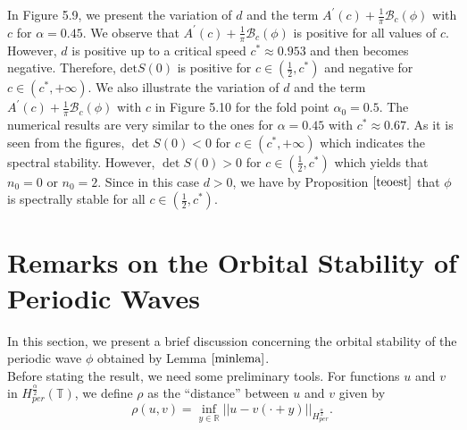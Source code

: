 \documentclass[12pt,reqno]{amsart}
\newcommand{\2}{L^2_{per}(0, T)}
\newcommand{\Hn}{{H_{per}^{\frac{\alpha}{2}}}}
\numberwithin{equation}{section}
\numberwithin{figure}{section}
\begin{document}
In Figure 5.9, we present the variation of $d$ and the term  $A^{\prime}(c)+\displaystyle\frac{1}{\pi} {\mathcal B}_c(\phi)$ with $c$ for $\alpha=0.45$.  We observe that
$A^{\prime}(c)+\displaystyle\frac{1}{\pi} {\mathcal B}_c(\phi)$ is  positive for all values of $c$. However, $d$ is positive up to a critical speed $c^* \approx 0.953$ and then becomes negative. Therefore, $\mbox{det} S(0)$ is positive for $c\in (\frac{1}{2}, c^*)$ and negative for $c\in (c^*, +\infty)$.   We  also illustrate  the variation of $d$ and the term  $A^{\prime}(c)+\displaystyle\frac{1}{\pi} {\mathcal B}_c(\phi)$ with $c$ in Figure 5.10 for the fold point $\alpha_0=0.5$. The numerical results are very similar to the ones for $\alpha=0.45$ with $c^* \approx 0.67$.  As it is seen from the figures,  $\det S(0)<0$  for $c\in (c^*, +\infty)$ which indicates the spectral stability.  However, $\det S(0)>0$  for $c\in (\frac{1}{2},c^*)$    which yields that $n_0=0$ or $n_0=2$. Since in this case $d>0$, we have by Proposition $\ref{teoest}$ that $\phi$ is spectrally stable for all $c\in (\frac{1}{2}, c^*)$.



\section{Remarks on the Orbital Stability of Periodic Waves}

In this section, we present a brief discussion concerning the orbital stability of the periodic wave $\phi$ obtained by Lemma $\ref{minlema}$.\\
\indent Before stating the result, we need some preliminary tools. For functions $u$ and $v$ in $H_{per}^\frac{\alpha}{2}(\mathbb{T})$, we define $\rho$ as the ``distance'' between $u$ and $v$  given  by
\begin{equation*}
	\rho(u,v)=\inf_{y\in\mathbb{R}}||u-v(\cdot+y)||_{\Hn}.
\end{equation*}
\end{document}
